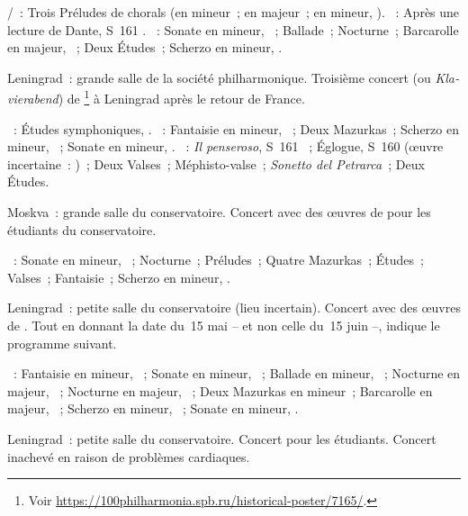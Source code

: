 \begin{description}
 \textsc{\JBach{}/\Busoni{}}~: Trois Préludes de chorals (en \kG mineur~; en
 \kG majeur~; en \kF mineur, ).
 \textsc{\Liszt{}}~: Après une lecture de Dante, S~161 .
 \textsc{\Chopin{}}~: Sonate  en \kB mineur, ~; Ballade~;
 Nocturne~; Barcarolle en \kF \Sharp majeur, ~; Deux Études~;
 Scherzo  en \kB mineur, .
 \item[\DateWithWeekDay{1930-05-31}]
 Leningrad~: grande salle de la société philharmonique.
 Troisième concert (ou \foreignlanguage{german}{\emph{Klavierabend}}) de
 \VSofronitsky{}%
 \footnote{Voir
 \href{https://100philharmonia.spb.ru/historical-poster/7165/}%
 {https://100philharmonia.spb.ru/historical-poster/7165/}.}
 à Leningrad après le retour de France.

 \textsc{\Schumann{}}~: Études symphoniques, .
 \textsc{\Chopin{}}~: Fantaisie en \kF mineur, ~; Deux Mazurkas~;
 Scherzo  en \kB \Flat mineur, ~; Sonate  en
 \kB \Flat mineur, .
 \textsc{\Liszt{}}~: \emph{Il penseroso}, S~161 ~; Églogue, S~160
  (œuvre incertaine~: )~; Deux Valses~;
 Méphisto-valse~; \emph{Sonetto del Petrarca}~; Deux Études.
 \item[\DateWithWeekDay{1930-06-08}]
 Moskva~: grande salle du conservatoire.
 Concert avec des œuvres de \Chopin{} pour les étudiants du conservatoire.

 \textsc{\Chopin{}}~: Sonate  en \kB \Flat mineur, ~;
 Nocturne~; Préludes~; Quatre Mazurkas~; Études~; Valses~; Fantaisie~;
 Scherzo  en \kB mineur, .
 \item[\DateWithWeekDay{1930-06-15}]
 Leningrad~: petite salle du conservatoire (lieu incertain).
 Concert avec des œuvres de \Chopin{}.
 Tout en donnant la date du~15 mai -- et non celle du~15 juin --,
 \citet[p.~152]{Nekrasova08} indique le programme \Chopin{} suivant.

 \textsc{\Chopin{}}~: Fantaisie en \kF mineur, ~; Sonate en \kB
 mineur, ~; Ballade en \kG mineur, ~; Nocturne en \kF
 \Sharp majeur,  ~; Nocturne en \kF majeur, 
 ~; Deux Mazurkas en \kC mineur~; Barcarolle en \kF \Sharp majeur,
 ~; Scherzo en \kB mineur, ~; Sonate en \kB \Flat mineur,
 .
 \item[\DateWithWeekDay{1930-07-05}]
 Leningrad~: petite salle du conservatoire.
 Concert pour les étudiants.
 Concert inachevé en raison de problèmes cardiaques.


\end{description}
